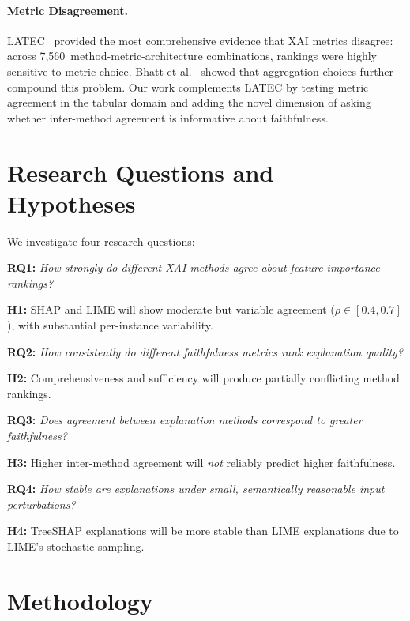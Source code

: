 \documentclass[conference, 10pt]{IEEEtran}
\begin{document}
\paragraph{Metric Disagreement.}
LATEC~\cite{hedstrom2024latec} provided the most comprehensive evidence that XAI metrics disagree: across 7,560~method-metric-architecture combinations, rankings were highly sensitive to metric choice. Bhatt et al.~\cite{bhatt2020evaluating} showed that aggregation choices further compound this problem. Our work complements LATEC by testing metric agreement in the tabular domain and adding the novel dimension of asking whether inter-method agreement is informative about faithfulness.

\section{Research Questions and Hypotheses}
\label{sec:research-questions}

We investigate four research questions:

\noindent\textbf{RQ1:} \emph{How strongly do different XAI methods agree about feature importance rankings?}

\noindent\textbf{H1:} SHAP and LIME will show moderate but variable agreement ($\rho \in [0.4, 0.7]$), with substantial per-instance variability.

\noindent\textbf{RQ2:} \emph{How consistently do different faithfulness metrics rank explanation quality?}

\noindent\textbf{H2:} Comprehensiveness and sufficiency will produce partially conflicting method rankings.

\noindent\textbf{RQ3:} \emph{Does agreement between explanation methods correspond to greater faithfulness?}

\noindent\textbf{H3:} Higher inter-method agreement will \emph{not} reliably predict higher faithfulness.

\noindent\textbf{RQ4:} \emph{How stable are explanations under small, semantically reasonable input perturbations?}

\noindent\textbf{H4:} TreeSHAP explanations will be more stable than LIME explanations due to LIME's stochastic sampling.

\section{Methodology}
\label{sec:methodology}
\end{document}
